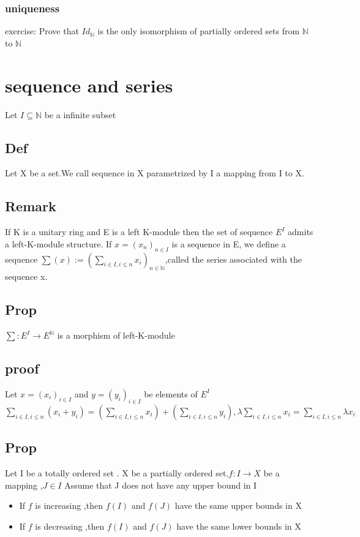 \documentclass{book}
\begin{document}
\subsection{uniqueness}
exercise: Prove that $Id_\mathbb{N}$ is the only isomorphism of partially ordered sets from $\mathbb{N} $ to $\mathbb{N} $
\chapter{sequence and series}
Let $I\subseteq \mathbb{N}$ be a infinite subset
\section{Def} Let X be a set.We call sequence in X parametrized by I a mapping from I to X.
\section{Remark}
If K is a unitary ring and E is a left K-module then the set of sequence $E^I$ admits a left-K-module structure. If $x=(x_n)_{n\in I}$ is a sequence in E, we define a sequence $\sum(x):=(\sum\limits_{i\in I,i\leq n}x_i)_{n\in \mathbb{N}}$,called the series associated with the sequence x.
\section{Prop}
$\sum:E^I\rightarrow E^\mathbb{N}$ is a morphism of left-K-module
\section{proof}
Let $x=(x_i)_{i\in I}$ and $y=(y_i)_{i\in I}$ be elements of $E^I$\\
$\sum\limits_{i\in I,i\leq n}(x_i+y_i)=(\sum\limits_{i\in I,i\leq n}x_i)+(\sum\limits_{i\in I,i\leq n}y_i),\lambda\sum\limits_{i\in I,i\leq n}x_i=\sum\limits_{i\in I,i\leq n}\lambda x_i$
\section{Prop}
Let I be a totally ordered set . X be a partially ordered set,$f:I\rightarrow X$ be a mapping ,$J\in I$ Assume that J does not have any upper bound in I
\begin{itemize}
    \item If $f$ is increasing ,then $f(I)$ and $f(J)$ have the same upper bounds in X
    \item If $f$ is decreasing ,then $f(I)$ and $f(J)$ have the same lower bounds in X
\end{itemize}
\end{document}
